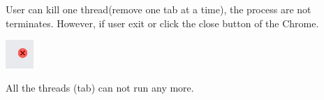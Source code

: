 \documentclass[12pt]{article}
\newenvironment{sol}[1][Solution]{\begin{trivlist}\item[\hskip\labelsep {\bfseries #1:}]}{\end{trivlist}}
\begin{document}
\begin{enumerate}
\begin{sol}
    User can kill one thread(remove one tab at a time), the process are not terminates. However, if user exit or click the close button of the Chrome.\\
    \begin{center}
        \includegraphics[width=0.08\textwidth]{problem7c.png}
    \end{center}
    All the threads (tab) can not run any more.
    
    
\end{sol}


\end{enumerate}
\end{document}
